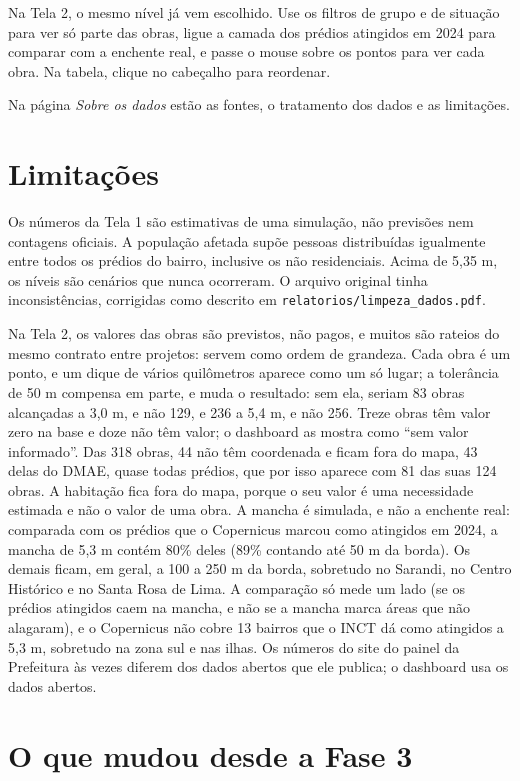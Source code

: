 \documentclass[11pt,a4paper]{article}
\newcommand{\campo}[1]{\texttt{#1}}
\begin{document}
Na Tela 2, o mesmo nível já vem escolhido. Use os filtros de grupo e de situação para ver só parte das obras, ligue a camada dos prédios atingidos em 2024 para comparar com a enchente real, e passe o mouse sobre os pontos para ver cada obra. Na tabela, clique no cabeçalho para reordenar.

Na página \emph{Sobre os dados} estão as fontes, o tratamento dos dados e as limitações.

\section{Limitações}

Os números da Tela 1 são estimativas de uma simulação, não previsões nem contagens oficiais. A população afetada supõe pessoas distribuídas igualmente entre todos os prédios do bairro, inclusive os não residenciais. Acima de 5,35 m, os níveis são cenários que nunca ocorreram. O arquivo original tinha inconsistências, corrigidas como descrito em \campo{relatorios/limpeza\_dados.pdf}.

Na Tela 2, os valores das obras são previstos, não pagos, e muitos são rateios do mesmo contrato entre projetos: servem como ordem de grandeza. Cada obra é um ponto, e um dique de vários quilômetros aparece como um só lugar; a tolerância de 50 m compensa em parte, e muda o resultado: sem ela, seriam 83 obras alcançadas a 3,0 m, e não 129, e 236 a 5,4 m, e não 256. Treze obras têm valor zero na base e doze não têm valor; o dashboard as mostra como ``sem valor informado''. Das 318 obras, 44 não têm coordenada e ficam fora do mapa, 43 delas do DMAE, quase todas prédios, que por isso aparece com 81 das suas 124 obras. A habitação fica fora do mapa, porque o seu valor é uma necessidade estimada e não o valor de uma obra. A mancha é simulada, e não a enchente real: comparada com os prédios que o Copernicus marcou como atingidos em 2024, a mancha de 5,3 m contém 80\% deles (89\% contando até 50 m da borda). Os demais ficam, em geral, a 100 a 250 m da borda, sobretudo no Sarandi, no Centro Histórico e no Santa Rosa de Lima. A comparação só mede um lado (se os prédios atingidos caem na mancha, e não se a mancha marca áreas que não alagaram), e o Copernicus não cobre 13 bairros que o INCT dá como atingidos a 5,3 m, sobretudo na zona sul e nas ilhas. Os números do site do painel da Prefeitura às vezes diferem dos dados abertos que ele publica; o dashboard usa os dados abertos.

\section{O que mudou desde a Fase 3}
\end{document}
